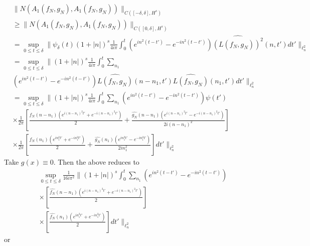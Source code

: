 \documentclass[12pt,reqno]{amsart}
\numberwithin{equation}{section}  %
\newcommand{\wh}{\widehat}
\begin{document}
\begin{equation*}
\begin{split}
  & \| N(A_{1}(f_{N}, g_{N}), A_{1}(f_{N}, g_{N})) \|_{C([-\delta, \delta],
  H^{s})}
  \\
 & \ge
  \| N(A_{1}(f_{N}, g_{N}), A_{1}(f_{N}, g_{N})) \|_{C([0, \delta],
  H^{s})} 
  \\
  & = \sup_{0 \le t \le \delta} \| \psi_{\delta}(t) (1 + | n |)^{s}
  \frac{1}{4 i \pi} \int_{0}^{t} \left( e^{in^{2}(t-t')} - e^{-in^{2}(t-t')} \right)
  \wh{(L(f_{N},g_{N}))^{2}}(n, t') dt' \|_{\ell^{2}_{n}}
  \\
  & = \sup_{0 \le t \le \delta} \| (1 + | n |)^{s} \frac{1}{4 i \pi} 
  \int_{0}^{t} \sum_{n_{1}}
  \\
  & \left( e^{in^{2}(t-t')} - e^{-in^{2}(t-t')} \right)
  \wh{L(f_{N},g_{N})}(n - n_{1}, t')\wh{L(f_{N},g_{N})}(n_{1}, t') dt'
  \|_{\ell^{2}_{n}}
  \\
  & = \sup_{0 \le t \le \delta} \| (1 + | n |)^{s} \frac{1}{4 i \pi} 
  \int_{0}^{t} \sum_{n_{1}} \left( e^{in^{2}(t-t')} - e^{-in^{2}(t-t')} \right)
  \psi(t')
  \\
  & \times \frac{1}{2 \pi} \left[ \frac{\wh{f_{N}}(n - n_{1})\left( e^{i(n - n_{1})^{2}t'} +
  e^{-i(n - n_{1})^{2}t'} \right)}{2} + \frac{\wh{g_{N}}(n - n_{1})\left(
  e^{i(n - n_{1})^{2}t'} - e^{-i(n - n_{1})^{2}t'}
  \right)}{2i(n - n_{1})^{2}} \right]
  \\
  & \times \frac{1}{2 \pi} \left[ \frac{\wh{f_{N}}(n_{1})\left( e^{in_{1}^{2}t'} +
  e^{-in_{1}^{2}t'} \right)}{2} + \frac{\wh{g_{N}}(n_{1})\left(
  e^{in_{1}^{2}t'} - e^{-in_{1}^{2}t'}
  \right)}{2 i n_{1}^{2}} \right]
  dt' \|_{\ell^{2}_{n}}
\end{split}
\end{equation*}
%
Take $g(x) \equiv 0$. Then the above reduces to
%
%
\begin{equation*}
\begin{split}
  & \sup_{0 \le t \le \delta} \frac{1}{16 i \pi^{2}}\| (1 + | n |)^{s}
  \int_{0}^{t} \sum_{n_{1}} \left( e^{in^{2}(t-t')} - e^{-in^{2}(t-t')} \right)
  \\
  & \times \left[ \frac{\wh{f_{N}}(n - n_{1})\left( e^{i(n - n_{1})^{2}t'} +
  e^{-i(n - n_{1})^{2}t'} \right)}{2} \right ]
  \\
  & \times \left[ \frac{\wh{f_{N}}(n_{1})\left( e^{in_{1}^{2}t'} +
  e^{-in_{1}^{2}t'} \right)}{2}  \right]
  dt' \|_{\ell^{2}_{n}}
\end{split}
\end{equation*}
%
%
or 
\end{document}
